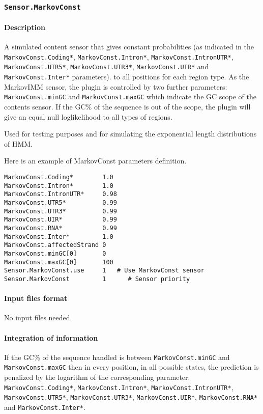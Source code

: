 
\subsubsection{\texttt{Sensor.MarkovConst}}

\paragraph{Description}

A simulated content sensor that gives constant probabilities (as
indicated in the \texttt{MarkovConst\-.Coding*},
\texttt{MarkovConst.Intron*}, \texttt{MarkovConst.IntronUTR*},
\texttt{MarkovConst.UTR5*}, \texttt{Mark\-ovConst.UTR3*},
\texttt{MarkovConst.UIR*} and \texttt{MarkovConst.Inter*} parameters).
to all positions for each region type. As the MarkovIMM sensor, the
plugin is controlled by two further parameters:
\texttt{MarkovConst.minGC} and \texttt{MarkovConst.maxGC} which
indicate the GC scope of the contents sensor. If the GC\% of the
sequence is out of the scope, the plugin will give an equal null
loglikelihood to all types of regions.

Used for testing purposes and for simulating the exponential length
distributions of HMM.

Here is an example of MarkovConst parameters definition.
\begin{Verbatim}[fontsize=\small]
MarkovConst.Coding*        1.0
MarkovConst.Intron*        1.0
MarkovConst.IntronUTR*     0.98
MarkovConst.UTR5*          0.99
MarkovConst.UTR3*          0.99
MarkovConst.UIR*           0.99
MarkovConst.RNA*           0.99
MarkovConst.Inter*         1.0
MarkovConst.affectedStrand 0
MarkovConst.minGC[0]       0
MarkovConst.maxGC[0]       100
Sensor.MarkovConst.use     1   # Use MarkovConst sensor
Sensor.MarkovConst         1      # Sensor priority
\end{Verbatim}

\paragraph{Input files format}

No input files needed.

\paragraph{Integration of information}

If the GC\% of the sequence handled is between
\texttt{MarkovConst.minGC} and \texttt{MarkovConst.maxGC} then in
every position, in all possible states, the prediction is penalized by
the logarithm of the corresponding parameter:
\texttt{MarkovConst.Coding*}, \texttt{MarkovConst.Intron*},
\texttt{MarkovConst.IntronUTR*}, \texttt{MarkovConst.UTR5*},
\texttt{MarkovConst.UTR3*}, \texttt{MarkovConst.UIR*}, 
\texttt{MarkovConst.RNA*} and \texttt{MarkovConst.Inter*}.

